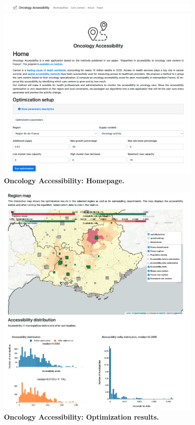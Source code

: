 \begin{figure}[H]
    \includegraphics[width=0.9\textwidth]{images/oncology-accessibility/home.png}
    \centering
    \caption{
        \textbf{Oncology Accessibility: Homepage.}
    }
\end{figure}

\begin{figure}[H]
    \includegraphics[width=0.9\textwidth]{images/oncology-accessibility/optim-paca-map.png}
    \centering
    \caption{
        \textbf{Oncology Accessibility: Optimization results.}
    }
\end{figure}

